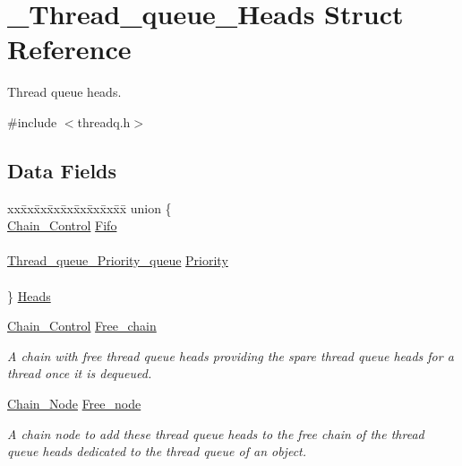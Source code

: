 \hypertarget{struct__Thread__queue__Heads}{}\section{\+\_\+\+Thread\+\_\+queue\+\_\+\+Heads Struct Reference}
\label{struct__Thread__queue__Heads}


Thread queue heads.  




{\ttfamily \#include $<$threadq.\+h$>$}

\subsection*{Data Fields}
\begin{DoxyCompactItemize}
\item 
\begin{tabbing}
xx\=xx\=xx\=xx\=xx\=xx\=xx\=xx\=xx\=\kill
union \{\\
\>\mbox{\hyperlink{unionChain__Control}{Chain\_Control}} \mbox{\hyperlink{struct__Thread__queue__Heads_a0810b5b56b238a61d7cf664b28e3d337}{Fifo}}\\
\>\\
\>\mbox{\hyperlink{structThread__queue__Priority__queue}{Thread\_queue\_Priority\_queue}} \mbox{\hyperlink{struct__Thread__queue__Heads_a2059f4ca3fa003a28d08bb11612607ee}{Priority}}\\
\>\\
\} \mbox{\hyperlink{struct__Thread__queue__Heads_a21d754973bc1115a827336f826e2d142}{Heads}}\\

\end{tabbing}\item 
\mbox{\label{struct__Thread__queue__Heads_a700b2b1b08a1e40eaba5cf833ddda02e}} 
\mbox{\hyperlink{unionChain__Control}{Chain\+\_\+\+Control}} \mbox{\hyperlink{struct__Thread__queue__Heads_a700b2b1b08a1e40eaba5cf833ddda02e}{Free\+\_\+chain}}
\begin{DoxyCompactList}\small\item\em A chain with free thread queue heads providing the spare thread queue heads for a thread once it is dequeued. \end{DoxyCompactList}\item 
\mbox{\label{struct__Thread__queue__Heads_a61c5352cb32c0bdf6a53c2ca89ff5ea5}} 
\mbox{\hyperlink{group__RTEMSScoreChain_ga0dd4bfcca1ac7f90de2842e447846d3d}{Chain\+\_\+\+Node}} \mbox{\hyperlink{struct__Thread__queue__Heads_a61c5352cb32c0bdf6a53c2ca89ff5ea5}{Free\+\_\+node}}
\begin{DoxyCompactList}\small\item\em A chain node to add these thread queue heads to the free chain of the thread queue heads dedicated to the thread queue of an object. \end{DoxyCompactList}\end{DoxyCompactItemize}


